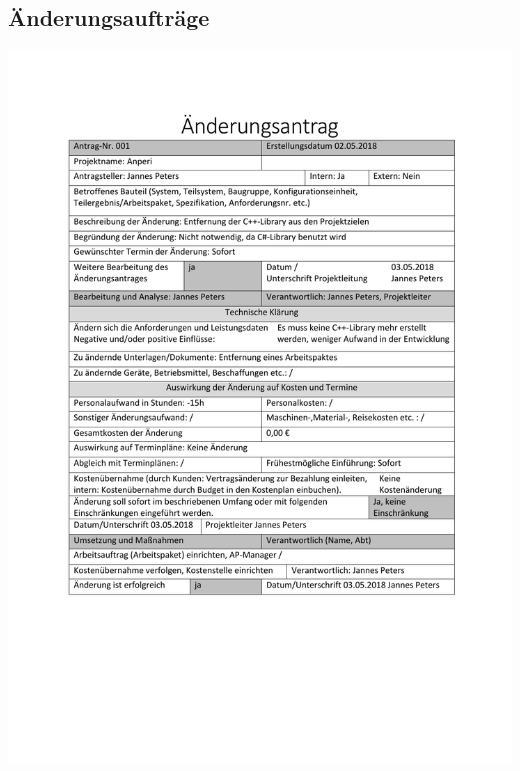 \documentclass{scrartcl}
\begin{document}
\subsection{Änderungsaufträge}
\includegraphics[scale=0.85]{Aenderungsantrag.pdf}
\end{document}
